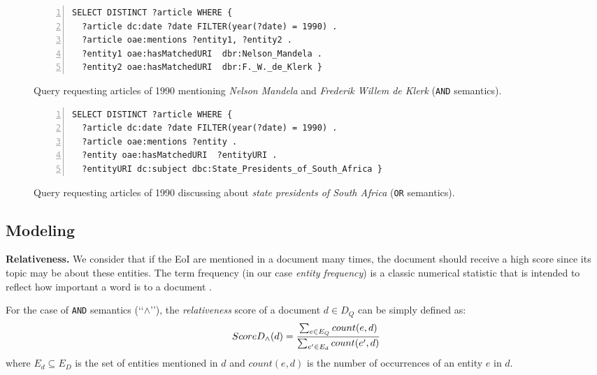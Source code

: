 \documentclass{libtex/sig-alternate-05-2015}
\newcommand{\q}[1]{\lq\lq{}{}#1\rq\rq{}{}}
\begin{document}
\begin{figure}[th]
\vspace{-2mm}
\centering \scriptsize
\begin{Verbatim}[frame=lines,numbers=left,numbersep=1pt]
SELECT DISTINCT ?article WHERE {
  ?article dc:date ?date FILTER(year(?date) = 1990) .
  ?article oae:mentions ?entity1, ?entity2 .
  ?entity1 oae:hasMatchedURI  dbr:Nelson_Mandela .
  ?entity2 oae:hasMatchedURI  dbr:F._W._de_Klerk }
\end{Verbatim}
\vspace{-5.5mm}
\caption{Query requesting articles of 1990 mentioning
{\em Nelson Mandela} and {\em Frederik Willem de Klerk} ({\tt AND} semantics).}
\label{fig:modelingExampleQ1}

\vspace{-2mm}
\centering \scriptsize
\begin{Verbatim}[frame=lines,numbers=left,numbersep=1pt]
SELECT DISTINCT ?article WHERE {
  ?article dc:date ?date FILTER(year(?date) = 1990) .
  ?article oae:mentions ?entity .
  ?entity oae:hasMatchedURI  ?entityURI .
  ?entityURI dc:subject dbc:State_Presidents_of_South_Africa }
\end{Verbatim}
\vspace{-5.5mm}
\caption{Query requesting articles of 1990 discussing
about {\em state presidents of South Africa} ({\tt OR} semantics).}
\label{fig:modelingExampleQ2}
\vspace{-2mm}
\end{figure}


\subsection{Modeling}

\noindent
{\bf Relativeness.}
We consider that if the EoI are mentioned
in a document many times, the document should receive a high score
since its topic may be about these entities.
The term frequency (in our case {\em entity frequency}) is a classic numerical statistic
that is intended to reflect how important
a word is to a document \cite{leskovec2014mining}.

For the case of {\tt AND} semantics (\q{$\wedge$}),
the {\em relativeness} score of a document $d \in D_Q$ can be
simply defined as:
\begin{equation}
\small
ScoreD_{\wedge}(d) = \frac{\sum_{e \in E_Q}{count(e, d)}}{\sum_{e' \in E_d}{count(e', d)}}
\end{equation}
where $E_d \subseteq E_D$ is the set of entities mentioned in $d$ and
$count(e, d)$ is the number of occurrences of an entity $e$ in $d$.
\end{document}
